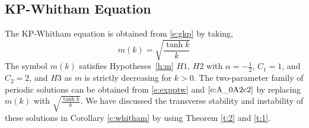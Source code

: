 \documentclass[12pt]{amsart}    %
\newtheorem{corollary}[theorem]{Corollary}
\numberwithin{equation}{section}
\begin{document}



\subsection{KP-Whitham Equation}
The KP-Whitham equation is obtained from \eqref{e:gkp} by taking,
\[
m(k)= \sqrt{\frac{\tanh k}{k}} 
\]
The symbol $m(k)$ satisfies Hypotheses~\ref{h:m} $H1$, $H2$ with $\alpha= -\frac{1}{2}$, $C_1=1$, and $C_2=2$, and $H3$ as $m$ is strictly decreasing for $k>0$. 
The two-parameter family of periodic solutions can be obtained from \eqref{e:expptw} and $\eqref{e:A_0A2c2}$ by replacing $m(k)$ with $\sqrt{\frac{\tanh k}{k}}$. We have discussed the transverse stability and instability of these solutions in Corollary \ref{c:whitham} by using Theorem \ref{t:2} and \ref{t:1}.

\end{document}

